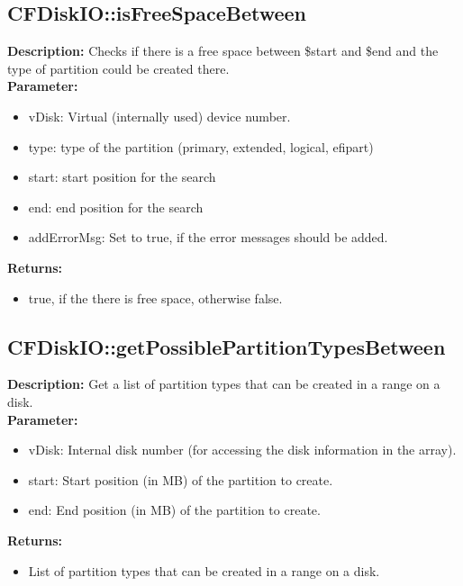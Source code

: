 \subsection{CFDiskIO::isFreeSpaceBetween}
\textbf{Description:} Checks if there is a free space between \$start and \$end and the type of partition could be created there.\\
\textbf{Parameter:}
\begin{itemize}
\item vDisk: Virtual (internally used) device number.
\item type: type of the partition (primary, extended, logical, efipart)
\item start: start position for the search
\item end: end position for the search
\item addErrorMsg: Set to true, if the error messages should be added.
\end{itemize}
\textbf{Returns:}
\begin{itemize}
\item true, if the there is free space, otherwise false.
\end{itemize}

\subsection{CFDiskIO::getPossiblePartitionTypesBetween}
\textbf{Description:} Get a list of partition types that can be created in a range on a disk.\\
\textbf{Parameter:}
\begin{itemize}
\item vDisk: Internal disk number (for accessing the disk information in the array).
\item start: Start position (in MB) of the partition to create.
\item end: End position (in MB) of the partition to create.
\end{itemize}
\textbf{Returns:}
\begin{itemize}
\item List of partition types that can be created in a range on a disk.
\end{itemize}

